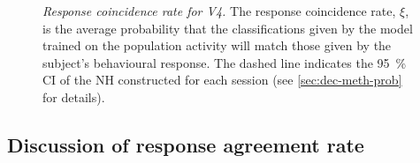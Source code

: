 \begin{figure}[htbp]
    \centering
    \hspace*{\fill}
    \hspace*{\fill}\hspace{.2cm}\hspace*{\fill}
    \hspace*{\fill}
    \caption{%
    \textit{Response coincidence rate for \ac{V4}.}
    The response coincidence rate, $\xi$, is the average probability that the classifications given by the model trained on the population activity will match those given by the subject's behavioural response.
    The dashed line indicates the \SI{95}{\percent} \acf{CI} of the \acf{NH} constructed for each session (see \autoref{sec:dec-meth-prob} for details).
}
    \label{fig:decag_all_v4}
\end{figure}


\subsection{Discussion of response agreement rate}
